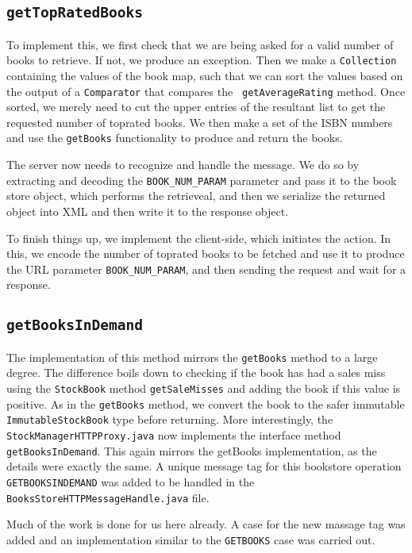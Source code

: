 \subsection{\tt getTopRatedBooks}
To implement this, we first check that we are being asked for a valid number of
books to retrieve. If not, we produce an exception. Then we make a
{\tt Collection} containing the values of the book map, such that we can sort
the values based on the output of a {\tt Comparator} that compares the {\tt
getAverageRating} method. Once sorted, we merely need to cut the upper entries
of the resultant list to get the requested number of toprated books. We then
make a set of the ISBN numbers and use the {\tt getBooks} functionality to
produce and return the books.

The server now needs to recognize and handle the message. We do so by
extracting and decoding the {\tt BOOK\_NUM\_PARAM} parameter and pass it to the
book store object, which performs the retrieveal, and then we serialize the
returned object into XML and then write it to the response object.

To finish things up, we implement the client-side, which initiates the action.
In this, we encode the number of toprated books to be fetched and use it to
produce the URL parameter {\tt BOOK\_NUM\_PARAM}, and then sending the request
and wait for a response.

\subsection{\tt getBooksInDemand}

The implementation of this method mirrors the {\tt getBooks} method to a large degree. The difference boils down to checking if the book has had a sales miss using the {\tt StockBook} method {\tt getSaleMisses} and adding the book if this value is positive. As in the {\tt getBooks} method, we convert the book to the safer immutable {\tt ImmutableStockBook} type before returning. More interestingly, the {\tt StockManagerHTTPProxy.java} now implements the interface method {\tt getBooksInDemand}. This again mirrors the {getBooks} implementation, as the details were exactly the same. A unique message tag for this bookstore operation {\tt GETBOOKSINDEMAND} was added to be handled in the {\tt BooksStoreHTTPMessageHandle.java} file.

Much of the work is done for us here already. A case for the new massage tag was added and an implementation similar to the {\tt GETBOOKS} case was carried out.


